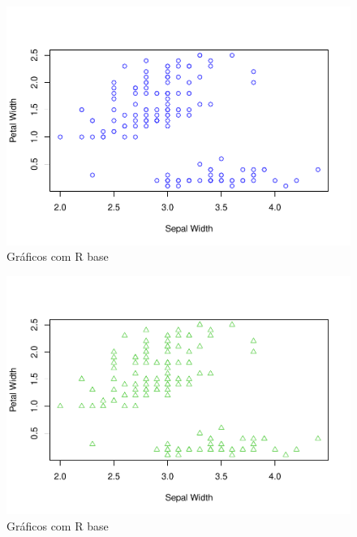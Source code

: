 \documentclass[
]{book}
\newenvironment{Shaded}{\begin{snugshade}}{\end{snugshade}}
\newcommand{\AttributeTok}[1]{\textcolor[rgb]{0.13,0.29,0.53}{#1}}
\newcommand{\CommentTok}[1]{\textcolor[rgb]{0.56,0.35,0.01}{\textit{#1}}}
\newcommand{\DecValTok}[1]{\textcolor[rgb]{0.00,0.00,0.81}{#1}}
\newcommand{\FunctionTok}[1]{\textcolor[rgb]{0.13,0.29,0.53}{\textbf{#1}}}
\newcommand{\NormalTok}[1]{#1}
\newcommand{\SpecialCharTok}[1]{\textcolor[rgb]{0.81,0.36,0.00}{\textbf{#1}}}
\newcommand{\StringTok}[1]{\textcolor[rgb]{0.31,0.60,0.02}{#1}}
\begin{document}
\begin{figure}
\centering
\includegraphics{_main_files/figure-latex/nome-do-chunk2-4.pdf}
\caption{\label{fig:nome-do-chunk2-4}Gráficos com R base}
\end{figure}

\begin{Shaded}
\end{Shaded}

\begin{figure}
\centering
\includegraphics{_main_files/figure-latex/nome-do-chunk2-5.pdf}
\caption{\label{fig:nome-do-chunk2-5}Gráficos com R base}
\end{figure}
\end{document}
